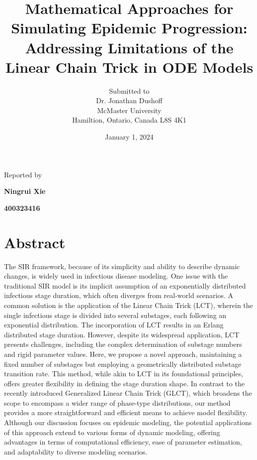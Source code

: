 \documentclass[12pt]{article}
\begin{document}
\title{Mathematical Approaches for Simulating Epidemic Progression: Addressing Limitations of the Linear Chain Trick in ODE Models}

\author{Submitted to\\ Dr. Jonathan Dushoff 
\\McMaster University\\Hamiltion, Ontario, Canada L8S 4K1}
\date {January 1, 2024}
\maketitle


\centerline{Reported by}
\centerline{\textbf{Ningrui Xie}}
\centerline{\textbf{400323416}}


\newpage
\section{Abstract}
The SIR framework, because of its simplicity and ability to describe dynamic changes, is widely used in infectious disease modeling. One issue with the traditional SIR model is its implicit assumption of an exponentially distributed infectious stage duration, which often diverges from real-world scenarios. A common solution is the application of the Linear Chain Trick (LCT), wherein the single infectious stage is divided into several substages, each following an exponential distribution. The incorporation of LCT results in an Erlang distributed stage duration. However, despite its widespread application, LCT presents challenges, including the complex determination of substage numbers and rigid parameter values. Here, we propose a novel approach, maintaining a fixed number of substages but employing a geometrically distributed substage transition rate. This method, while akin to LCT in its foundational principles, offers greater flexibility in defining the stage duration shape. In contrast to the recently introduced Generalized Linear Chain Trick (GLCT), which broadens the scope to encompass a wider range of phase-type distributions, our method provides a more straightforward and efficient means to achieve model flexibility. Although our discussion focuses on epidemic modeling, the potential applications of this approach extend to various forms of dynamic modeling, offering advantages in terms of computational efficiency, ease of parameter estimation, and adaptability to diverse modeling scenarios. 
\end{document}
